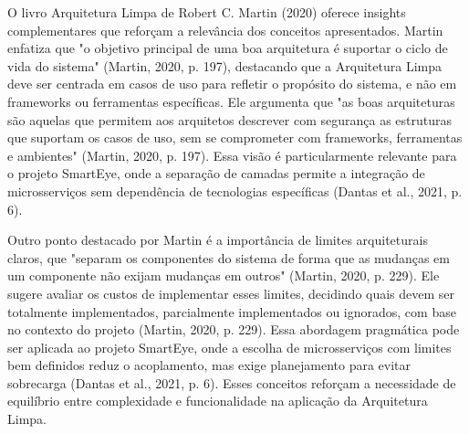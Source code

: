 O livro Arquitetura Limpa de Robert C. Martin (2020) oferece insights complementares que reforçam a relevância dos conceitos apresentados. Martin enfatiza que "o objetivo principal de uma boa arquitetura é suportar o ciclo de vida do sistema" (Martin, 2020, p. 197), destacando que a Arquitetura Limpa deve ser centrada em casos de uso para refletir o propósito do sistema, e não em frameworks ou ferramentas específicas. Ele argumenta que "as boas arquiteturas são aquelas que permitem aos arquitetos descrever com segurança as estruturas que suportam os casos de uso, sem se comprometer com frameworks, ferramentas e ambientes" (Martin, 2020, p. 197). Essa visão é particularmente relevante para o projeto SmartEye, onde a separação de camadas permite a integração de microsserviços sem dependência de tecnologias específicas (Dantas et al., 2021, p. 6).

Outro ponto destacado por Martin é a importância de limites arquiteturais claros, que "separam os componentes do sistema de forma que as mudanças em um componente não exijam mudanças em outros" (Martin, 2020, p. 229). Ele sugere avaliar os custos de implementar esses limites, decidindo quais devem ser totalmente implementados, parcialmente implementados ou ignorados, com base no contexto do projeto (Martin, 2020, p. 229). Essa abordagem pragmática pode ser aplicada ao projeto SmartEye, onde a escolha de microsserviços com limites bem definidos reduz o acoplamento, mas exige planejamento para evitar sobrecarga (Dantas et al., 2021, p. 6). Esses conceitos reforçam a necessidade de equilíbrio entre complexidade e funcionalidade na aplicação da Arquitetura Limpa.